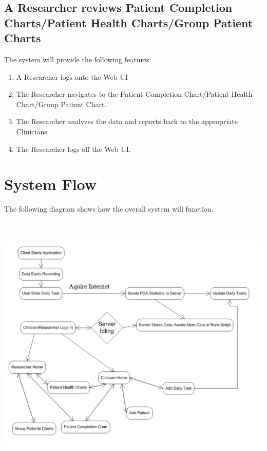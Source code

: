 \documentclass{article}
\begin{document}
\subsection{A Researcher reviews Patient Completion Charts/Patient Health Charts/Group Patient Charts}	
The system will provide the following features:
\begin{enumerate}
\item A Researcher logs onto the Web UI
\item The Researcher navigates to the Patient Completion Chart/Patient Health Chart/Group Patient Chart.
\item The Researcher analyzes the data and reports back to the appropriate Clinicians.
\item The Researcher logs off the Web UI.
\end{enumerate} 



\newpage
\section{System Flow}
The following diagram shows how the overall system will function.


\begin{center}
\includegraphics[width=6in, height=5in]{HLDSystemFlow.jpg}
\label{fig:systemflow}
\end{center}
\end{document}

